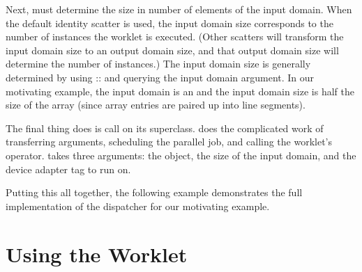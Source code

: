 
Next,  must determine the size in number of elements of the input domain.
When the default identity scatter is used, the input domain size corresponds to the number of instances the worklet is executed.
(Other scatters will transform the input domain size to an output domain size, and that output domain size will determine the number of instances.)
The input domain size is generally determined by using :: and querying the input domain argument.
In our motivating example, the input domain is an  and the input domain size is half the size of the array (since array entries are paired up into line segments).

The final thing  does is call  on its  superclass.
 does the complicated work of transferring arguments, scheduling the parallel job, and calling the worklet's operator.
 takes three arguments: the  object, the size of the input domain, and the device adapter tag to run on.


Putting this all together, the following example demonstrates the full implementation of the dispatcher for our motivating example.




\section{Using the Worklet}
\label{sec:NewWorkletTypes:Using}






